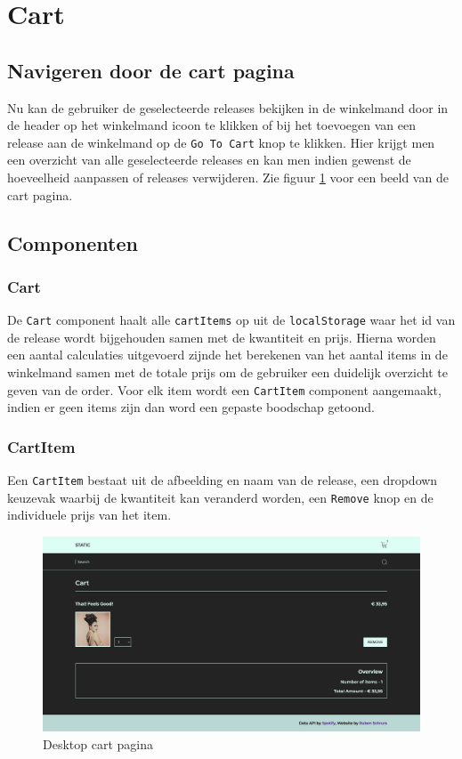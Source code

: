 \section{Cart}

\subsection{Navigeren door de cart pagina}

Nu kan de gebruiker de geselecteerde releases bekijken in de winkelmand door in de header op het winkelmand icoon te klikken of bij het toevoegen van een release aan de winkelmand op de \texttt{Go To Cart} knop te klikken. Hier krijgt men een overzicht van alle geselecteerde releases en kan men indien gewenst de hoeveelheid aanpassen of releases verwijderen. Zie figuur \ref{fig:desktopCart} voor een beeld van de cart pagina.

\subsection{Componenten}

\subsubsection{Cart}

De \texttt{Cart} component haalt alle \texttt{cartItems} op uit de \texttt{localStorage} waar het id van de release wordt bijgehouden samen met de kwantiteit en prijs. Hierna worden een aantal calculaties uitgevoerd zijnde het berekenen van het aantal items in de winkelmand samen met de totale prijs om de gebruiker een duidelijk overzicht te geven van de order. Voor elk item wordt een \texttt{CartItem} component aangemaakt, indien er geen items zijn dan word een gepaste boodschap getoond.

\subsubsection{CartItem}

Een \texttt{CartItem} bestaat uit de afbeelding en naam van de release, een dropdown keuzevak waarbij de kwantiteit kan veranderd worden, een \texttt{Remove} knop en de individuele prijs van het item.

\begin{figure}[h]
	\centering
	\includegraphics[width=1\linewidth]{graphics/desktopCart}
	\caption[Desktop cart pagina]{Desktop cart pagina}
	\label{fig:desktopCart}
\end{figure}

